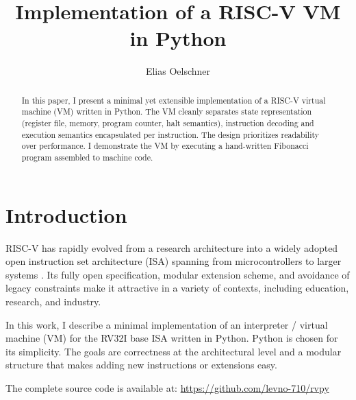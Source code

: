 \documentclass[sigconf]{acmart}
\begin{document}
\title{Implementation of a RISC-V VM in Python}

\author{Elias Oelschner}

\renewcommand{\shortauthors}{Oelschner}

\begin{abstract}
In this paper, I present a minimal yet extensible implementation of a RISC-V virtual machine (VM) written in Python. The VM cleanly separates state representation (register file, memory, program counter, halt semantics), instruction decoding and execution semantics encapsulated per instruction. The design prioritizes readability over performance. I demonstrate the VM by executing a hand-written Fibonacci program assembled to machine code.
\end{abstract}

\maketitle

\section{Introduction}
RISC-V has rapidly evolved from a research architecture into a widely adopted open instruction set architecture (ISA) spanning from microcontrollers to larger systems \cite{riscv-spec}. Its fully open specification, modular extension scheme, and avoidance of legacy constraints make it attractive in a variety of contexts, including education, research, and industry.

In this work, I describe a minimal implementation of an interpreter / virtual machine (VM) for the RV32I base ISA written in Python. Python is chosen for its simplicity. The goals are correctness at the architectural level and a modular structure that makes adding new instructions or extensions easy.

 The complete source code is available at: \url{https://github.com/levno-710/rvpy}
\end{document}
